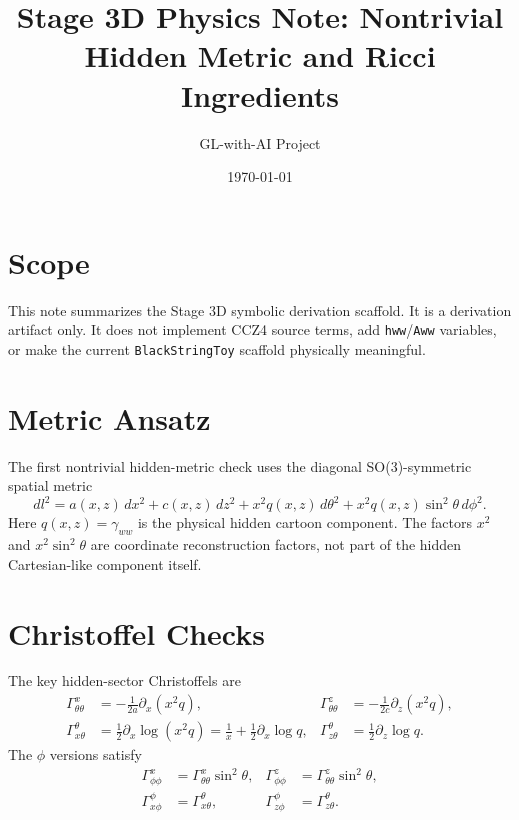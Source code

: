 \documentclass[11pt]{article}
\title{Stage 3D Physics Note: Nontrivial Hidden Metric and Ricci Ingredients}
\author{GL-with-AI Project}
\date{\today}
\begin{document}
\maketitle

\section{Scope}

This note summarizes the Stage 3D symbolic derivation scaffold. It is a
derivation artifact only. It does not implement CCZ4 source terms, add
\texttt{hww}/\texttt{Aww} variables, or make the current
\texttt{BlackStringToy} scaffold physically meaningful.

\section{Metric Ansatz}

The first nontrivial hidden-metric check uses the diagonal SO(3)-symmetric
spatial metric
\begin{equation}
  dl^2
  =
  a(x,z)\,dx^2
  + c(x,z)\,dz^2
  + x^2 q(x,z)\,d\theta^2
  + x^2 q(x,z)\sin^2\theta\,d\phi^2 .
\end{equation}
Here \(q(x,z)=\gamma_{ww}\) is the physical hidden cartoon component. The
factors \(x^2\) and \(x^2\sin^2\theta\) are coordinate reconstruction factors,
not part of the hidden Cartesian-like component itself.

\section{Christoffel Checks}

The key hidden-sector Christoffels are
\begin{align}
  \Gamma^x_{\theta\theta}
  &=
  -\frac{1}{2a}\partial_x(x^2q),&
  \Gamma^z_{\theta\theta}
  &=
  -\frac{1}{2c}\partial_z(x^2q),\\
  \Gamma^\theta_{x\theta}
  &=
  \frac{1}{2}\partial_x\log(x^2q)
  =
  \frac{1}{x}+\frac{1}{2}\partial_x\log q,&
  \Gamma^\theta_{z\theta}
  &=
  \frac{1}{2}\partial_z\log q .
\end{align}
The \(\phi\) versions satisfy
\begin{align}
  \Gamma^x_{\phi\phi}
  &=
  \Gamma^x_{\theta\theta}\sin^2\theta,&
  \Gamma^z_{\phi\phi}
  &=
  \Gamma^z_{\theta\theta}\sin^2\theta,\\
  \Gamma^\phi_{x\phi}
  &=
  \Gamma^\theta_{x\theta},&
  \Gamma^\phi_{z\phi}
  &=
  \Gamma^\theta_{z\theta}.
\end{align}
\end{document}

